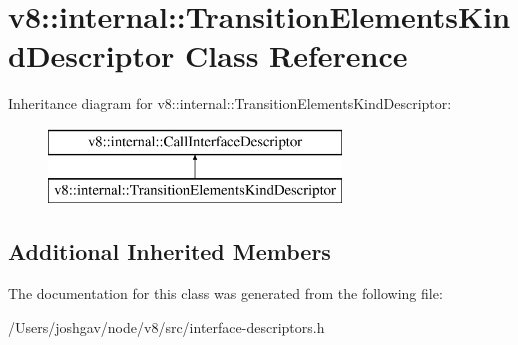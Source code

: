 \hypertarget{classv8_1_1internal_1_1_transition_elements_kind_descriptor}{}\section{v8\+:\+:internal\+:\+:Transition\+Elements\+Kind\+Descriptor Class Reference}
\label{classv8_1_1internal_1_1_transition_elements_kind_descriptor}
Inheritance diagram for v8\+:\+:internal\+:\+:Transition\+Elements\+Kind\+Descriptor\+:\begin{figure}[H]
\begin{center}
\leavevmode
\includegraphics[height=2.000000cm]{classv8_1_1internal_1_1_transition_elements_kind_descriptor}
\end{center}
\end{figure}
\subsection*{Additional Inherited Members}


The documentation for this class was generated from the following file\+:\begin{DoxyCompactItemize}
\item 
/\+Users/joshgav/node/v8/src/interface-\/descriptors.\+h\end{DoxyCompactItemize}
